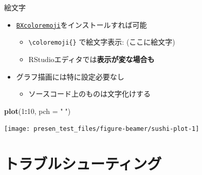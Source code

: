 \documentclass[
  12pt,
  ignorenonframetext,
]{beamer}
\newenvironment{Shaded}{\begin{snugshade}}{\end{snugshade}}
\newcommand{\DataTypeTok}[1]{\textcolor[rgb]{0.13,0.29,0.53}{#1}}
\newcommand{\DecValTok}[1]{\textcolor[rgb]{0.00,0.00,0.81}{#1}}
\newcommand{\KeywordTok}[1]{\textcolor[rgb]{0.13,0.29,0.53}{\textbf{#1}}}
\newcommand{\NormalTok}[1]{#1}
\newcommand{\OperatorTok}[1]{\textcolor[rgb]{0.81,0.36,0.00}{\textbf{#1}}}
\newcommand{\StringTok}[1]{\textcolor[rgb]{0.31,0.60,0.02}{#1}}
\providecommand{\tightlist}{%
  \setlength{\itemsep}{0pt}\setlength{\parskip}{0pt}}
\begin{document}
\begin{frame}[fragile]{絵文字}
\protect\hypertarget{ux7d75ux6587ux5b57}{}

\begin{itemize}
\tightlist
\item
  \href{https://github.com/zr-tex8r/BXcoloremoji}{\texttt{BXcoloremoji}}をインストールすれば可能

  \begin{itemize}
  \tightlist
  \item
    \texttt{\textbackslash{}coloremoji\{\}} で絵文字表示:
    \ifdefined{} {} \else (ここに絵文字) \fi
  \item
    RStudioエディタでは\textbf{表示が変な場合も}
  \end{itemize}
\item
  グラフ描画には特に設定必要なし

  \begin{itemize}
  \tightlist
  \item
    ソースコード上のものは文字化けする
  \end{itemize}
\end{itemize}

\begin{Shaded}
\begin{Highlighting}[]
\KeywordTok{plot}\NormalTok{(}\DecValTok{1}\OperatorTok{:}\DecValTok{10}\NormalTok{, }\DataTypeTok{pch =} \StringTok{"🍣"}\NormalTok{)}
\end{Highlighting}
\end{Shaded}

\begin{center}\texttt{[image: presen\_test\_files/figure-beamer/sushi-plot-1]} \end{center}

\end{frame}

\hypertarget{ux30c8ux30e9ux30d6ux30ebux30b7ux30e5ux30fcux30c6ux30a3ux30f3ux30b0}{%
\section{トラブルシューティング}\label{ux30c8ux30e9ux30d6ux30ebux30b7ux30e5ux30fcux30c6ux30a3ux30f3ux30b0}}
\end{document}
